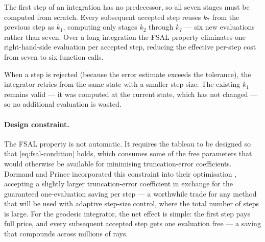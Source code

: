 The first step of an integration has no predecessor, so all seven stages
must be computed from scratch.  Every subsequent accepted step reuses
$k_7$ from the previous step as $k_1$, computing only stages
$k_2$ through $k_7$ --- six new evaluations rather than seven.  Over
a long integration the FSAL property eliminates one right-hand-side
evaluation per accepted step, reducing the effective per-step cost from
seven to six function calls.

When a step is rejected (because the error estimate exceeds the
tolerance), the integrator retries from the same state with a smaller
step size.  The existing $k_1$ remains valid --- it was computed at the
current state, which has not changed --- so no additional evaluation is
wasted.

\paragraph{Design constraint.}

The FSAL property is not automatic.  It requires the tableau to be
designed so that \cref{eq:fsal-condition} holds, which consumes some
of the free parameters that would otherwise be available for
minimising truncation-error coefficients.  Dormand and Prince
incorporated this constraint into their optimisation
\cite{DormandPrince1980}, accepting a slightly larger truncation-error
coefficient in exchange for the guaranteed one-evaluation saving per
step --- a worthwhile trade for any method that will be used with
adaptive step-size control, where the total number of steps is large.
For the geodesic integrator, the net effect is simple: the first step
pays full price, and every subsequent accepted step gets one evaluation
free --- a saving that compounds across millions of rays.
